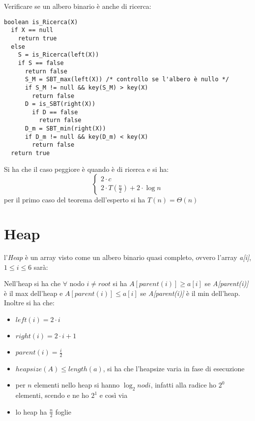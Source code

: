 \documentclass[a4paper,12pt,oneside,tikz]{book}
\begin{document}
\begin{esercizio}
Verificare se un albero binario è anche di ricerca:
\begin{verbatim}
boolean is_Ricerca(X)
  if X == null
    return true
  else
    S = is_Ricerca(left(X))
    if S == false
      return false
      S_M = SBT_max(left(X)) /* controllo se l'albero è nullo */
      if S_M != null && key(S_M) > key(X)
        return false
      D = is_SBT(right(X))
        if D == false
          return false
      D_m = SBT_min(right(X))
      if D_m != null && key(D_m) < key(X)
        return false
  return true
\end{verbatim}
Si ha che il caso peggiore è quando è di ricerca e si ha:
$$\begin{cases}
2\cdot c\\
2\cdot T\left(\frac{n}{2}\right)+2\cdot\log n
\end{cases}$$
per il primo caso del teorema dell'esperto si ha $T(n)=\Theta(n)$
\end{esercizio}
\section{Heap}
l'\textit{Heap} è un array visto come un albero binario quasi completo, ovvero l'array \textit{a[i]}, $1\leq i\leq 6$ sarà:
\begin{center}
\end{center}
Nell'heap si ha che $\forall$ nodo $i\neq root$ si ha $A[parent(i)]\geq a[i]$ se \textit{A[parent(i)]} è il max dell'heap e $A[parent(i)]\leq a[i]$ se \textit{A[parent(i)]} è il min dell'heap.\\Inoltre si ha che:
\begin{itemize}
\item $left(i)=2\cdot i$
\item $right(i)=2\cdot i+1$
\item $parent(i)=\frac{i}{2}$
\item $heapsize(A)\leq length(a)$, si ha che l'heapsize varia in fase di esecuzione
\item per $n$ elementi nello heap si hanno $\log_2 nodi$, infatti alla radice ho $2^0$ elementi, scendo e ne ho $2^1$ e così via
\item lo heap ha $\frac{n}{2}$ foglie
\end{itemize}
\newpage
\end{document}
